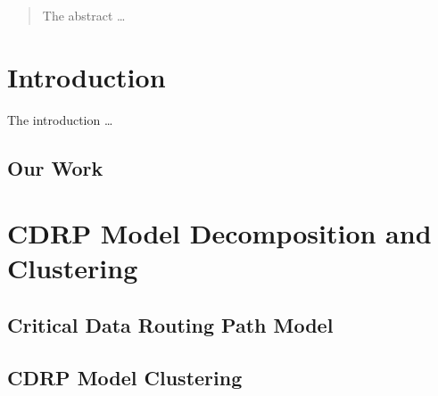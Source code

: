 \documentclass[sigplan,10pt,review]{acmart}\settopmatter{printfolios=true,printccs=false,printacmref=false}
\begin{document}
\begin{abstract}
  The abstract \dots
\end{abstract}





\keywords{}  %


\maketitle

\section{Introduction}
The introduction \dots

\subsection{Our Work}

\section{CDRP Model Decomposition and Clustering}
\subsection{Critical Data Routing Path Model}
\subsection{CDRP Model Clustering}
\end{document}
